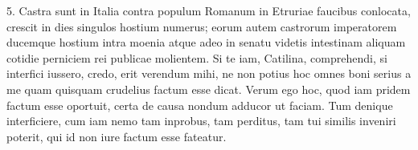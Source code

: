 {  %
  5. Castra sunt in Italia contra populum Romanum in Etruriae faucibus conlocata, crescit in dies singulos hostium numerus; eorum autem castrorum imperatorem ducemque hostium intra moenia atque adeo in senatu videtis intestinam aliquam cotidie perniciem rei publicae molientem. Si te iam, Catilina, comprehendi, si interfici iussero, credo, erit verendum mihi, ne non potius hoc omnes boni serius a me quam quisquam crudelius factum esse dicat. Verum ego hoc, quod iam pridem factum esse oportuit, certa de causa nondum adducor ut faciam. Tum denique interficiere, cum iam nemo tam inprobus, tam perditus, tam tui similis inveniri poterit, qui id non iure factum esse fateatur.

}
